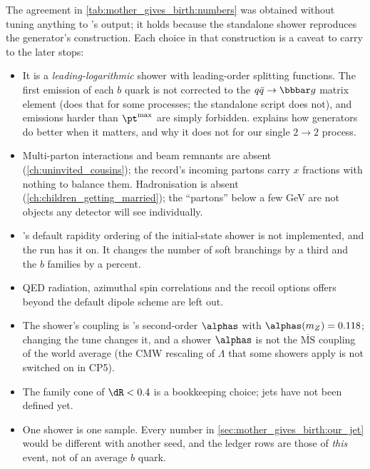 The agreement in \cref{tab:mother_gives_birth:numbers} was obtained without
tuning anything to \PYTHIA's output; it holds because the standalone shower
reproduces the generator's construction. Each choice in that construction
is a caveat to carry to the later stops:
\begin{itemize}
  \item It is a \emph{leading-logarithmic} shower with leading-order
    splitting functions. The first emission of each $b$ quark is not
    corrected to the $q\bar q\to\bbbar g$ matrix element (\PYTHIA does that
    for some processes; the standalone script does not), and emissions
    harder than $\pt^{\max}$ are simply forbidden. 
    explains how generators do better when it matters, and why it does not
    for our single $2\to2$ process.
  \item Multi-parton interactions and beam remnants are absent
    (\cref{ch:uninvited_cousins}); the record's incoming partons carry $x$
    fractions with nothing to balance them. Hadronisation is absent
    (\cref{ch:children_getting_married}); the ``partons'' below a few GeV are not
    objects any detector will see individually.
  \item \PYTHIA's default rapidity ordering of the initial-state shower is
    not implemented, and the \CMSSW run has it on. It changes the number of
    soft branchings by a third and the $b$ families by a percent.
  \item QED radiation, azimuthal spin correlations and the recoil options
    \PYTHIA offers beyond the default dipole scheme are left out.
  \item The shower's coupling is \PYTHIA's second-order $\alphas$ with
    $\alphas(m_Z)=0.118$; changing the tune changes it, and a shower
    $\alphas$ is not the $\overline{\mathrm{MS}}$ coupling of the world
    average (the CMW rescaling of $\Lambda$ that some showers apply is not
    switched on in CP5).
  \item The family cone of $\dR<0.4$ is a bookkeeping choice; jets have
    not been defined yet.
  \item One shower is one sample. Every number in
    \cref{sec:mother_gives_birth:our_jet} would be different with another
    seed, and the ledger rows are those of \emph{this} event, not of an
    average $b$ quark.
\end{itemize}

